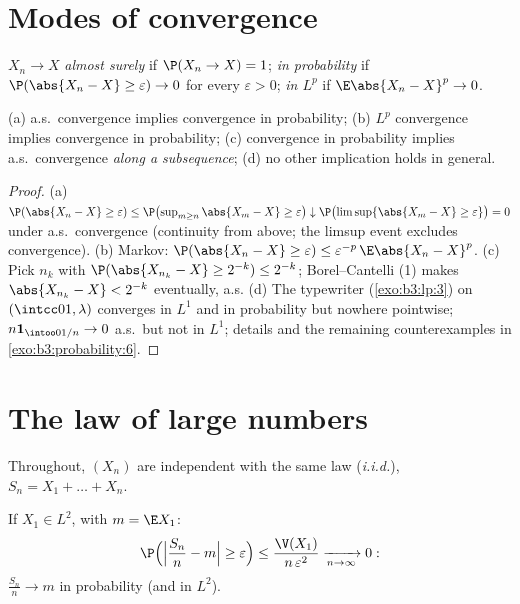 \section{Modes of convergence}

\begin{definition}\label{def:b3:probability:modes}
$X_n \to X$ \emph{almost surely} if $\P(X_n \to X) = 1$;
\emph{in probability} if $\P(\abs{X_n - X} \geq \varepsilon)
\to 0$ for every $\varepsilon > 0$; \emph{in $L^p$} if
$\E\abs{X_n - X}^p \to 0$.
\end{definition}

\begin{proposition}\label{prop:b3:probability:modes}
(a) a.s.\ convergence implies convergence in probability;
(b) $L^p$ convergence implies convergence in probability;
(c) convergence in probability implies a.s.\ convergence
\emph{along a subsequence};
(d) no other implication holds in general.
\end{proposition}

\begin{proof}
(a) $\P(\abs{X_n - X} \geq \varepsilon) \leq
\P\bigl(\sup_{m\geq n}\abs{X_m - X} \geq \varepsilon\bigr)
\downarrow \P\bigl(\limsup\{\abs{X_m - X} \geq
\varepsilon\}\bigr) = 0$ under a.s.\ convergence (continuity
from above; the limsup event excludes convergence). (b)
Markov: $\P(\abs{X_n - X} \geq \varepsilon) \leq
\varepsilon^{-p}\,\E\abs{X_n - X}^p$. (c) Pick $n_k$ with
$\P(\abs{X_{n_k} - X} \geq 2^{-k}) \leq 2^{-k}$;
Borel--Cantelli (1) makes $\abs{X_{n_k} - X} < 2^{-k}$
eventually, a.s. (d) The typewriter (\cref{exo:b3:lp:3}) on
$(\intcc01, \lambda)$ converges in $L^1$ and in probability
but nowhere pointwise; $n\mathbf 1_{\intoo0{1/n}} \to 0$
a.s.\ but not in $L^1$; details and the remaining
counterexamples in \cref{exo:b3:probability:6}.
\end{proof}

\section{The law of large numbers}

Throughout, $(X_n)$ are independent with the same law
(\emph{i.i.d.}), $S_n = X_1 + \dots + X_n$.

\begin{theorem}
\label{thm:b3:probability:wlln}
If $X_1 \in L^2$, with $m = \E X_1$:
\[
\P\Bigl(\Bigl|\frac{S_n}{n} - m\Bigr| \geq
\varepsilon\Bigr) \leq
\frac{\V(X_1)}{n\,\varepsilon^2}
\xrightarrow[n\to\infty]{} 0 :
\]
$\frac{S_n}n \to m$ in probability (and in $L^2$).
\end{theorem}

